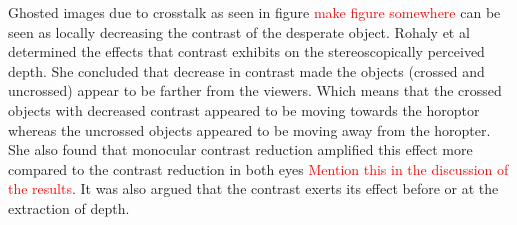 Ghosted images due to crosstalk as seen in figure \textcolor{red}{make figure somewhere} can be seen as locally decreasing the contrast of the desperate object. Rohaly et al \cite{rohaly1999effects} determined the effects that contrast exhibits on the stereoscopically perceived depth. She concluded that decrease in contrast made the objects (crossed and uncrossed) appear to be farther from the viewers. Which means that the crossed objects with decreased contrast appeared to be moving towards the horoptor whereas the uncrossed objects appeared to be moving away from the horopter. She also found that monocular contrast reduction amplified this effect more compared to the contrast reduction in both eyes \textcolor{red}{Mention this in the discussion of the results}. It was also argued that the contrast exerts its effect before or at the extraction of depth.

